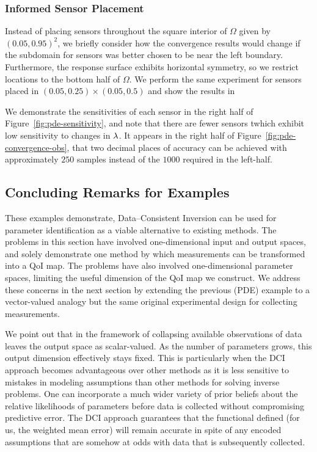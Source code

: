 \subsubsection{Informed Sensor Placement}
Instead of placing sensors throughout the square interior of $\Omega$ given by $(0.05, 0.95)^2$, we briefly consider how the convergence results would change if the subdomain for sensors was better chosen to be near the left boundary.
Furthermore, the response surface exhibits horizontal symmetry, so we restrict locations to the bottom half of $\Omega$.
We perform the same experiment for sensors placed in $(0.05, 0.25)\times(0.05, 0.5)$ and show the results in

We demonstrate the sensitivities of each sensor in the right half of Figure~\ref{fig:pde-sensitivity}, and note that there are fewer sensors twhich exhibit low sensitivity to changes in $\lambda$.
It appears in the right half of Figure~\ref{fig:pde-convergence-obs}, that two decimal places of accuracy can be achieved with approximately $250$ samples instead of the $1000$ required in the left-half.

\FloatBarrier

\subsection{Concluding Remarks for Examples}

These examples demonstrate, Data--Consistent Inversion can be used for parameter identification as a viable alternative to existing methods.
The problems in this section have involved one-dimensional input and output spaces, and solely demonstrate one method by which measurements can be transformed into a QoI map.
The problems have also involved one-dimensional parameter spaces, limiting the useful dimension of the QoI map we construct.
We address these concerns in the next section by extending the previous (PDE) example to a vector-valued analogy but the same original experimental design for collecting measurements.

We point out that in the framework of collapsing available observations of data leaves the output space as scalar-valued.
As the number of parameters grows, this output dimension effectively stays fixed.
This is particularly when the DCI approach becomes advantageous over other methods as it is less sensitive to mistakes in modeling assumptions than other methods for solving inverse problems.
One can incorporate a much wider variety of prior beliefs about the relative likelihoods of parameters before data is collected without compromising predictive error.
The DCI approach guarantees that the functional defined (for us, the weighted mean error) will remain accurate in spite of any encoded assumptions that are somehow at odds with data that is subsequently collected.
